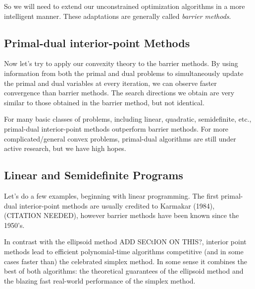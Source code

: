 \documentclass{article}
\numberwithin{equation}{section}
\theoremstyle{definition}
\begin{document}
So we will need to extend our unconstrained optimization algorithms in a more intelligent manner. These adaptations are generally called \textit{barrier methods}.
\subsection{Primal-dual interior-point Methods}
Now let's try to apply our convexity theory to the barrier methods. By using information from both the primal and dual problems to simultaneously update the primal and dual variables at every iteration, we can observe faster convergence than barrier methods. The search directions we obtain are very similar to those obtained in the barrier method, but not identical.

For many basic classes of problems, including linear, quadratic, semidefinite, etc., primal-dual interior-point methods outperform barrier methods. For more complicated/general convex problems, primal-dual algorithms are still under active research, but we have high hopes.
\subsection{Linear and Semidefinite Programs}
Let's do a few examples, beginning with linear programming. The first primal-dual interior-point methods are usually credited to Karmakar (1984), (CITATION NEEDED), however barrier methods have been known since the 1950's. 

In contrast with the ellipsoid method ADD SECtION ON THIS?, interior point methods lead to efficient polynomial-time algorithms competitive (and in some cases faster than) the celebrated simplex method. In some sense it combines the best of both algorithms: the theoretical guarantees of the ellipsoid method and the blazing fast real-world performance of the simplex method.
\end{document}
